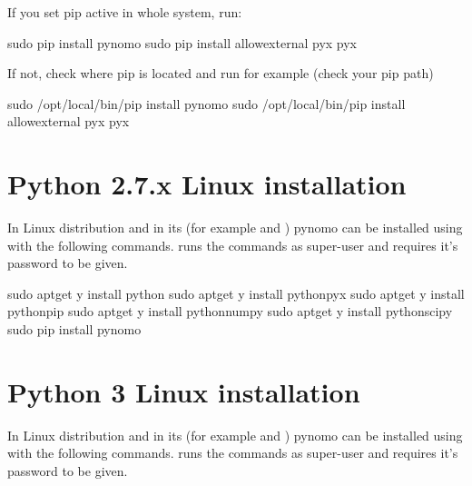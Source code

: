 \documentclass[a4paper,11pt,english]{sphinxmanual}
\begin{document}
If you set pip active in whole system, run:

\begin{sphinxVerbatim}[commandchars=\\\{\},formatcom=\scriptsize]
\PYGZdl{} sudo pip install pynomo
\PYGZdl{} sudo pip install \PYGZhy{}\PYGZhy{}allow\PYGZhy{}external pyx pyx
\end{sphinxVerbatim}

If not, check where pip is located and run for example (check your pip path)

\begin{sphinxVerbatim}[commandchars=\\\{\},formatcom=\scriptsize]
\PYGZdl{} sudo /opt/local/bin/pip install pynomo
\PYGZdl{} sudo /opt/local/bin/pip install \PYGZhy{}\PYGZhy{}allow\PYGZhy{}external pyx pyx
\end{sphinxVerbatim}


\section{Python 2.7.x Linux installation}
\label{\detokenize{installation/installation:python-2-7-x-linux-installation}}
In 
Linux distribution and in its  (for example   and ) pynomo can be installed using  with the following commands.
 runs the commands as super-user and requires it’s password to be given.

\begin{sphinxVerbatim}[commandchars=\\\{\},formatcom=\scriptsize]
\PYGZdl{} sudo apt\PYGZhy{}get \PYGZhy{}y install python
\PYGZdl{} sudo apt\PYGZhy{}get \PYGZhy{}y install python\PYGZhy{}pyx
\PYGZdl{} sudo apt\PYGZhy{}get \PYGZhy{}y install python\PYGZhy{}pip
\PYGZdl{} sudo apt\PYGZhy{}get \PYGZhy{}y install python\PYGZhy{}numpy
\PYGZdl{} sudo apt\PYGZhy{}get \PYGZhy{}y install python\PYGZhy{}scipy
\PYGZdl{} sudo pip install pynomo
\end{sphinxVerbatim}


\section{Python 3 Linux installation}
\label{\detokenize{installation/installation:python-3-linux-installation}}
In 
Linux distribution and in its  (for example   and ) pynomo can be installed using  with the following commands.
 runs the commands as super-user and requires it’s password to be given.
\end{document}

